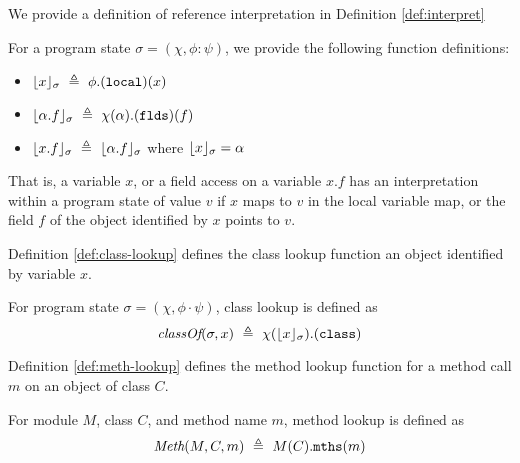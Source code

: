 We provide a definition of reference interpretation in Definition \ref{def:interpret}
\begin{definition}
\label{def:interpret}
For a program state $\sigma = (\chi, \phi : \psi)$, we provide the following function definitions:
\begin{itemize}
\item
$\interpret{\sigma}{x}\ \triangleq\ \phi.(\prg{local})(x)$
\item
$\interpret{\sigma}{\alpha.f}\ \triangleq\ \chi(\alpha).(\prg{flds})(f)$
\item
$\interpret{\sigma}{x.f}\ \triangleq\ \interpret{\sigma}{\alpha.f}$ where $\lfloor x \rfloor_{\sigma}=\alpha$
\end{itemize}
\end{definition}
That is, a variable $x$, or a field access on a variable $x.f$ 
has an interpretation within a program state of value $v$
if $x$ maps to $v$ in the local variable map, or the field
$f$ of the object identified by $x$ points to $v$.

Definition \ref{def:class-lookup} defines the class lookup function an object 
identified by variable $x$.
\begin{definition}
\label{def:class-lookup}
For program state $\sigma = (\chi, \phi \cdot\psi)$, class lookup is defined as 
$$\class{\sigma}{x}\ \triangleq\ \chi(\interpret{\sigma}{x}).(\prg{class})$$
\end{definition}

Definition \ref{def:meth-lookup} defines the method lookup function for a method
call $m$ on an object of class $C$.
\begin{definition}
\label{def:meth-lookup}
For module $M$, class $C$, and method name $m$, method lookup is defined as 
$$\meth{M}{C}{m}\ \triangleq\ M(C).\prg{mths}(m)$$
\end{definition}

